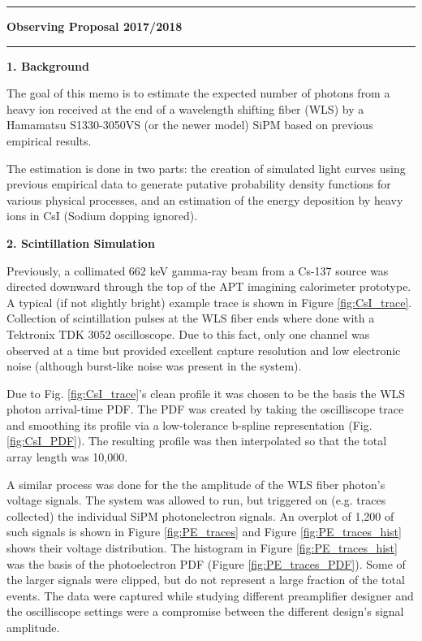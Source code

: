 \documentclass[11pt]{article}
\begin{document}
	
	\begin{center}
		\rule[0.2cm]{16.6cm}{0.1cm}
		\large{\bf Observing Proposal 2017/2018}
		\rule[0.2cm]{16.6cm}{0.1cm}
	\end{center}
		
	{\bf 1. Background}

	The goal of this memo is to estimate the expected number of photons from a heavy ion received at the end of a wavelength shifting fiber (WLS) by a Hamamatsu S1330-3050VS (or the newer model) SiPM based on previous empirical results.
	
	The estimation is done in two parts: the creation of simulated light curves using previous empirical data to generate putative probability density functions for various physical processes, and an estimation of the energy deposition by heavy ions in CsI (Sodium dopping ignored).
	
	{\bf 2. Scintillation Simulation}
	
	Previously, a collimated 662 keV gamma-ray beam from a Cs-137 source was directed downward through the top of the APT imagining calorimeter prototype. A typical (if not slightly bright) example trace is shown in Figure \ref{fig:CsI_trace}. Collection of scintillation pulses at the WLS fiber ends where done with a Tektronix TDK 3052 oscilloscope. Due to this fact, only one channel was observed at a time but provided excellent capture resolution and low electronic noise (although burst-like noise was present in the system).
	
	Due to Fig. \ref{fig:CsI_trace}'s clean profile it was chosen to be the basis the WLS photon arrival-time PDF. The PDF was created by taking the oscilliscope trace and smoothing its profile via a low-tolerance b-spline representation (Fig. \ref{fig:CsI_PDF}). The resulting profile was then interpolated so that the total array length was 10,000.
	
	A similar process was done for the the amplitude of the WLS fiber photon's voltage signals. The system was allowed to run, but triggered on (e.g. traces collected) the individual SiPM photonelectron signals. An overplot of 1,200 of such signals is shown in Figure \ref*{fig:PE_traces} and Figure \ref{fig:PE_traces_hist} shows their voltage distribution. The histogram in Figure \ref{fig:PE_traces_hist} was the basis of the photoelectron PDF (Figure \ref{fig:PE_traces_PDF}). Some of the larger signals were clipped, but do not represent a large fraction of the total events. The data were captured while studying different preamplifier designer and the oscilliscope settings were a compromise between the different design's
	signal amplitude.
	
\end{document}
